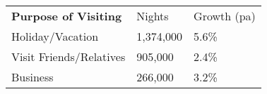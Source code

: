 \begin{tabular}[t]{p{5cm}p{1.3cm}p{1.2cm}}
 \textbf{Purpose of Visiting} & Nights & Growth (pa) \\ 
 Holiday/Vacation & 1,374,000 & 5.6\% \\ 
  Visit Friends/Relatives &   905,000 & 2.4\% \\ 
  Business &   266,000 & 3.2\% \\ 
  \end{tabular}
